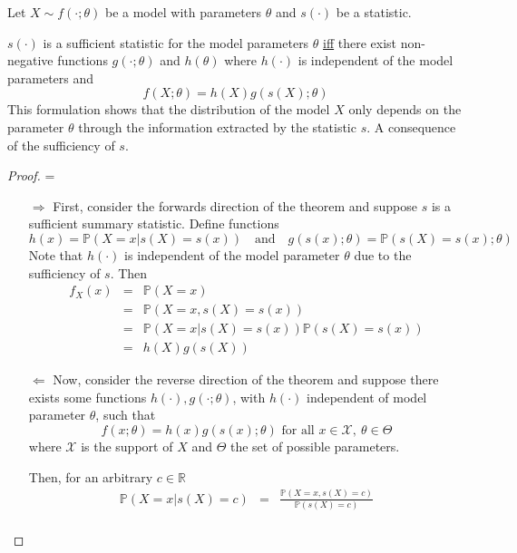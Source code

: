 \documentclass[bibliography=totoc,11pt,a4paper,margin=0]{article}
\newcommand*{\prob}{\mathbb{P}}
\theoremstyle{break}
\begin{document}
  \begin{box_theorem}\label{fisher_neyman_factorisation_criterion}
    \par\par Let $X\sim f(\cdot;\theta)$ be a model with parameters $\theta$ and $s(\cdot)$ be a statistic.
    \par $s(\cdot)$ is a sufficient statistic for the model parameters $\theta$ \underline{iff} there exist non-negative functions $g(\cdot;\theta)$ and $h(\theta)$ where $h(\cdot)$ is independent of the model parameters\footnotemark{} and
    \[ f(X;\theta)=h(X)g(s(X);\theta) \]
    This formulation shows that the distribution of the model $X$ only depends on the parameter $\theta$ through the information extracted by the statistic $s$. A consequence of the sufficiency of $s$.
    \begin{proof} \cite[]{fnf_theorem_proof}
      \everymath={\displaystyle}
      \begin{itemize}
        \item[$\Longrightarrow$] First, consider the forwards direction of the theorem and suppose $s$ is a sufficient summary statistic. Define functions
        \[ h(x)=\prob(X=x|s(X)=s(x))\quad\text{and}\quad g(s(x);\theta)=\prob(s(X)=s(x);\theta)\]
        Note that $h(\cdot)$ is independent of the model parameter $\theta$ due to the sufficiency of $s$. Then
        \[\begin{array}{rcl}
          f_X(x)&=&\prob(X=x)\\
          &=&\prob(X=x,s(X)=s(x))\\
          &=&\prob(X=x|s(X)=s(x))\prob(s(X)=s(x))\\
          &=&h(X)g(s(X))
        \end{array}\]
        \item[$\Longleftarrow$] Now, consider the reverse direction of the theorem and suppose there exists some functions $h(\cdot),g(\cdot;\theta)$, with $h(\cdot)$ independent of model parameter $\theta$, such that
        \[ f(x;\theta)=h(x)g(s(x);\theta)\text{ for all }x\in\mathcal{X},\ \theta\in\Theta \]
        where $\mathcal{X}$ is the support of $X$ and $\Theta$ the set of possible parameters.
        \par Then, for an arbitrary $c\in\mathbb{R}$
        \[\begin{array}{rcl}
          \prob(X=x|s(X)=c)&=&\frac{\prob(X=x,s(X)=c)}{\prob(s(X)=c)}\\

\end{array}\]
\end{itemize}
\end{proof}
\end{box_theorem}
\end{document}
